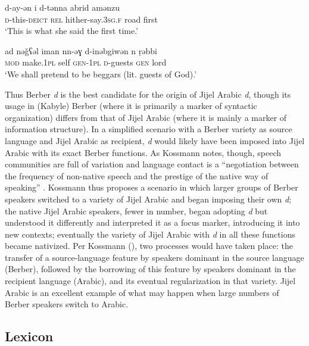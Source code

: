 \documentclass[output=paper]{langsci/langscibook}
\begin{document}
\ea\label{Berber cleft}

\gll d-ay-ǝn  i  d-tǝnna  abrid  amǝnzu\\
     \textsc{d}-this-\textsc{deict}  \textsc{rel}  hither-say.\textsc{3sg.f}  road  first\\
\glt ‘This is what she said the first time.’
\z

\ea\label{Berber secondary}

\gll ad  nǝǧʕǝl  iman  nn-ǝɣ  d-inǝbgiwǝn  n  ṛǝbbi\\
     \textsc{mod} make.\textsc{1pl} self \textsc{gen-1pl}  \textsc{d}-guests \textsc{gen}  lord\\
\glt ‘We shall pretend to be beggars (lit. guests of God).’
\z

Thus Berber \textit{d} is the best candidate for the origin of Jijel Arabic \textit{d}, though its usage in (Kabyle) Berber (where it is primarily a marker of syntactic organization) differs from that of Jijel Arabic (where it is mainly a marker of information structure). In a simplified scenario with a Berber variety as source language and Jijel Arabic as recipient, \textit{d} would likely have been imposed into Jijel Arabic with its exact Berber functions. As Kossmann notes, though, speech communities are full of variation and language contact is a “negotiation between the frequency of non-native speech and the prestige of the native way of speaking” \citep[138]{Kossmann2014}. Kossmann thus proposes a scenario in which larger groups of Berber speakers switched to a variety of Jijel Arabic and began imposing their own \textit{d}; the native Jijel Arabic speakers, fewer in number, began adopting \textit{d} but understood it differently and interpreted it as a focus marker, introducing it into new contexts; eventually the variety of Jijel Arabic with \textit{d} in all these functions became nativized. Per Kossmann (\citeyear[138]{Kossmann2014}), two processes would have taken place: the transfer of a source-language feature by speakers dominant in the source language (Berber), followed by the borrowing of this feature by speakers dominant in the recipient language (Arabic), and its eventual regularization in that variety. Jijel Arabic is an excellent example of what may happen when large numbers of Berber speakers switch to Arabic.

\subsection{Lexicon}\label{lexicon}
\end{document}
